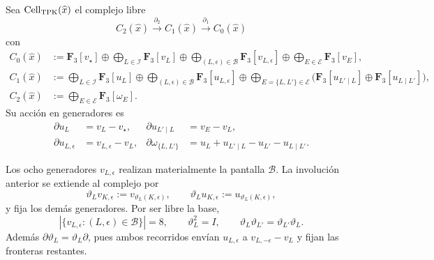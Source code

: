 \begin{definition}
\label{rm:def:pdfv2-cor-completacion-celular-tpk}
Sea \(\operatorname{Cell}_{\rm TPK}(\widehat x)\) el complejo libre
\[
 C_2(\widehat x)\xrightarrow{\partial_2}
 C_1(\widehat x)\xrightarrow{\partial_1}C_0(\widehat x)
\]
con
\begin{align*}
 C_0(\widehat x)
 &:=
 \mathbf F_3[v_\star]\oplus
 \bigoplus_{L\in\mathscr I}\mathbf F_3[v_L]\oplus
 \bigoplus_{(L,\epsilon)\in\mathscr B}
       \mathbf F_3[v_{L,\epsilon}]\oplus
 \bigoplus_{E\in\mathscr E}\mathbf F_3[v_E],\\
 C_1(\widehat x)
 &:=
 \bigoplus_{L\in\mathscr I}\mathbf F_3[u_L]\oplus
 \bigoplus_{(L,\epsilon)\in\mathscr B}
       \mathbf F_3[u_{L,\epsilon}]\oplus
 \bigoplus_{E=\{L,L'\}\in\mathscr E}
 \bigl(\mathbf F_3[u_{L'\mid L}]
       \oplus\mathbf F_3[u_{L\mid L'}]\bigr),\\
 C_2(\widehat x)
 &:=
 \bigoplus_{E\in\mathscr E}\mathbf F_3[\omega_E].
\end{align*}
Su acción en generadores es
\begin{align}
 \partial u_L&=v_L-v_\star,
 &
 \partial u_{L'\mid L}&=v_E-v_L,
 \label{rm:eq:pdfv2-cor-cell-frontera-aristas}\\
 \partial u_{L,\epsilon}&=v_{L,\epsilon}-v_L,
 &
 \partial\omega_{\{L,L'\}}
 &=u_L+u_{L'\mid L}-u_{L'}-u_{L\mid L'}.
 \label{rm:eq:pdfv2-cor-cell-frontera-celda}
\end{align}
\end{definition}

Los ocho generadores \(v_{L,\epsilon}\) realizan materialmente la pantalla
\(\mathscr B\). La involución anterior se extiende al complejo por
\begin{equation}
\label{rm:eq:pdfv2-cor-pantalla-ocho-generadores}
 \vartheta_Lv_{K,\epsilon}:=v_{\vartheta_L(K,\epsilon)},\qquad
 \vartheta_Lu_{K,\epsilon}:=u_{\vartheta_L(K,\epsilon)},
\end{equation}
y fija los demás generadores. Por ser libre la base,
\begin{equation}
\label{rm:eq:pdfv2-cor-pantalla-ocho-no-colapso}
 |\{v_{L,\epsilon}:(L,\epsilon)\in\mathscr B\}|=8,\qquad
 \vartheta_L^2=I,\qquad
 \vartheta_L\vartheta_{L'}=\vartheta_{L'}\vartheta_L.
\end{equation}
Además \(\partial\vartheta_L=\vartheta_L\partial\), pues ambos recorridos
envían \(u_{L,\epsilon}\) a \(v_{L,-\epsilon}-v_L\) y fijan las fronteras
restantes.


